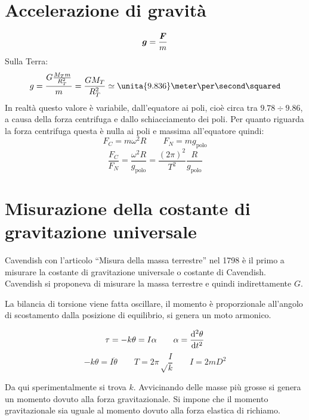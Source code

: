 \section{Accelerazione di gravità}
\begin{equation*}\boldsymbol{g}=\frac{\boldsymbol{F}}{m}\end{equation*}
Sulla Terra: \begin{equation*}g = \frac{G\frac{M_Tm}{R_T^2}}{m}=\frac{GM_T}{R_T^2}\simeq \unita{9.836}\meter\per\second\squared\end{equation*}
In realtà questo valore è variabile, dall'equatore ai poli, cioè
circa tra $9.78\div9.86$, a causa della forza centrifuga e dallo
schiacciamento dei poli. Per quanto riguarda la forza centrifuga
questa è nulla ai poli e massima all'equatore quindi:
\begin{equation*}F_C=m\omega^2R\qquad F_N=mg_{\text{polo}}\end{equation*}
\begin{equation*}\frac{F_C}{F_N}=\frac{\omega^2R}{g_{\text{polo}}}=\frac{(2\pi)^2}{T^2}\frac{R}{g_{\text{polo}}}\end{equation*}
\section{Misurazione della costante di gra\-vi\-ta\-zio\-ne u\-ni\-ver\-sa\-le}
Cavendish con l'articolo ``Misura della massa terrestre'' nel
1798 è il primo a misurare la costante di gravitazione universale
o costante di Cavendish. Cavendish si proponeva di misurare la
massa terrestre e quindi indirettamente $G$.

La bilancia di torsione viene fatta oscillare, il momento è
proporzionale all'angolo di scostamento dalla posizione di
equilibrio, si genera un moto armonico.

\begin{equation*}\tau=-k\theta=I\alpha\qquad\alpha=\frac{\mathrm{d}^2\theta}{\mathrm{d} t^2}\end{equation*}
\begin{equation*}-k\theta=I\ddot\theta\qquad T=2\pi\sqrt\frac{I}{k}\qquad I=2mD^2\end{equation*}


Da qui sperimentalmente si trova $k$. Avvicinando delle masse più
grosse si genera un momento dovuto alla forza gravitazionale. Si
impone che il momento gravitazionale sia uguale al momento dovuto
alla forza elastica di richiamo.

